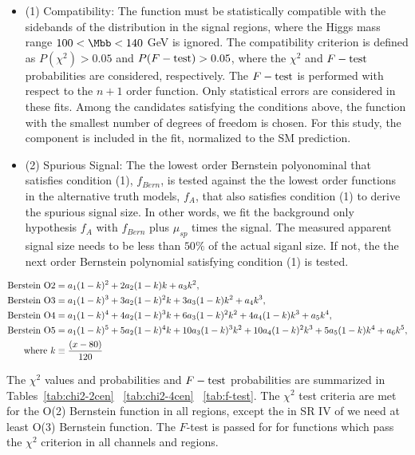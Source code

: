 \begin{itemize}
\item (1) Compatibility: The function must be statistically 
compatible with the sidebands of the \Mbb{} distribution in the signal regions,
where the Higgs mass range $100<\Mbb<140$ GeV is ignored. The compatibility criterion is defined as $P(\chi^2)>0.05$ and $P(F-\rm{test})>0.05$, 
where the $\chi^2$ and $F-\rm{test}$ probabilities are considered, respectively.
The $F-\rm{test}$ is performed with respect to the $n+1$ order function.  Only statistical errors are considered in these fits. 
Among the candidates satisfying the conditions above, the function with the smallest
number of degrees of freedom is chosen.
For this study, the \zjets{} component is included in the fit, 
normalized to the SM prediction.

\item (2) Spurious Signal: 
The the lowest order Bernstein polyonominal that satisfies condition (1), $f_{Bern}$, is tested against the the lowest order 
functions in the alternative truth models, $f_{A}$, that also satisfies condition (1) to derive the spurious signal size. 
In other words, we fit the background only hypothesis $f_{A}$ with $f_{Bern}$ plus $\mu_{sp}$ times the signal. The measured  apparent signal size needs to be less than $50\%$ of the actual siganl size. If not, the the next order Bernstein polynomial satisfying condition (1) is tested. 

\end{itemize}


\begin{equation}
\label{eq:bernstein}
\begin{aligned}
\textnormal{Berstein O2} &= a_1(1-k)^2 + 2a_2(1-k)k + a_3k^2, \\
\textnormal{Berstein O3} &= a_1(1-k)^3 + 3a_2(1-k)^2k + 3a_3(1-k)k^2 + a_4k^3, \\
\textnormal{Berstein O4} &= a_1(1-k)^4 + 4a_2(1-k)^3k + 6a_3(1-k)^2k^2 + 4a_4(1-k)k^3 + a_5k^4,\\
\textnormal{Berstein O5} &= a_1(1-k)^5 + 5a_2(1-k)^4k + 10a_3(1-k)^3k^2 + 10a_4(1-k)^2k^3 + 5a_5(1-k)k^4 +a_6k^5, \\
\textnormal{where } k &\equiv \frac{(x-80)}{120}
\end{aligned}
\end{equation}


The $\chi^2$ values and probabilities  and $F-\rm{test}$ probabilities are summarized 
in Tables~\ref{tab:chi2-2cen} ~\ref{tab:chi2-4cen} ~\ref{tab:f-test}.
The $\chi^2$ test criteria are met for the O(2) Bernstein function in all regions, except the in 
SR IV of \fourcentral we need at least O(3) Bernstein function. The $F$-test is passed for for functions
which pass the $\chi^2$ criterion in all channels and regions.

